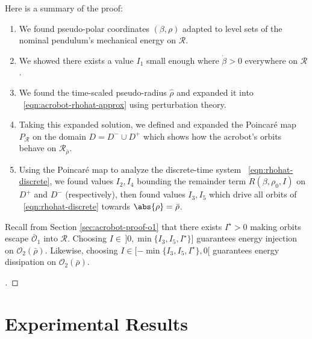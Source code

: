 Here is a summary of the proof:
\begin{enumerate}
    \item We found pseudo-polar coordinates \((\beta,\rho)\) adapted to level
        sets of the nominal pendulum's mechanical energy on \(\mathcal{R}\).
    \item We showed there exists a value \(I_1\) small enough where
        \(\dot{\beta} > 0\) everywhere on \(\mathcal{R}\).
    \item We found the time-scaled pseudo-radius \(\hat{\rho}\) and expanded it
        into ~\eqref{eqn:acrobot-rhohat-approx} using perturbation theory.
    \item Taking this expanded solution, we defined and expanded the
        Poincar\'{e} map \(P_\mathcal{R}\) on the domain 
        \(D = D^- \cup D^+\) which shows how the acrobot's orbits behave on
        \(\mathcal{R}_{\bar{\rho}}\).
    \item Using the Poincar\'{e} map to analyze the discrete-time system
        ~\eqref{eqn:rhohat-discrete}, we found values \(I_2,I_4\) bounding the
        remainder term \(R(\beta,\rho_0,I)\) on \(D^+\) and \(D^-\)
        (respectively), then found values \(I_3, I_5\) which drive all orbits of
        ~\eqref{eqn:rhohat-discrete} towards \(\abs{\rho} = \bar{\rho}\).
\end{enumerate}
Recall from Section \ref{sec:acrobot-proof-o1} that there exists \(I^\star > 0\)
making orbits escape \(\bar{\mathcal{O}}_1\) into 
\(\mathcal{R}\). 
Choosing \(I \in \,]0,\min\{I_3,I_5,I^\star\}]\)
guarantees energy injection on \(\mathcal{O}_2(\bar{\rho})\).
Likewise, choosing \(I \in [-\min\{I_3,I_5,I^\star\},0[\) guarantees energy
dissipation on \(\mathcal{O}_2(\bar{\rho})\).

\begin{proof}[\unskip\nopunct]
\end{proof}

\section{Experimental Results}

